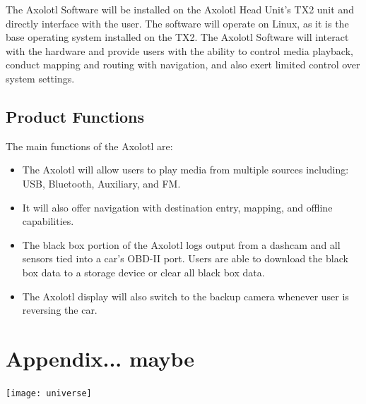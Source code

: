 \documentclass[onecolumn, draftclsnofoot,10pt, compsoc]{IEEEtran}
\begin{document}
The Axolotl Software will be installed on the Axolotl Head Unit’s TX2 unit and directly interface with the user. The software will operate on Linux, as it is the base operating system installed on the TX2. The Axolotl Software will interact with the hardware and provide users with the ability to control media playback, conduct mapping and routing with navigation, and also exert limited control over system settings.\par

\subsection{Product Functions}
The main functions of the Axolotl are:
\begin{itemize}
	\item	The Axolotl will allow users to play media from multiple sources including: USB, Bluetooth, Auxiliary, and FM.

	\item	It will also offer navigation with destination entry, mapping, and offline capabilities. 
	\item	The black box portion of the Axolotl logs output from a dashcam and all sensors tied into a car’s OBD-II port. Users are able to download the black box data to a storage device or clear all black box data. 
	\item	The Axolotl display will also switch to the backup camera whenever user is reversing the car.
	
\end{itemize}
\section{Appendix... maybe}
\texttt{[image: universe]}
\end{document}
